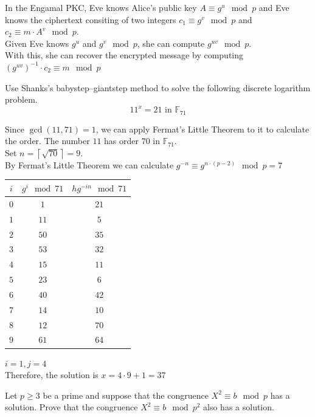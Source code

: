 \documentclass[12pt]{article}
\begin{document}
\solution
In the Engamal PKC, Eve knows Alice's public key $A\equiv g^u\mod{p}$ and Eve knows the ciphertext consiting of two integers $c_1\equiv g^v\mod{p}$ and $c_2\equiv m\cdot A^v\mod{p}$.\\
Given Eve knows $g^u$ and $g^v\mod{p}$, she can compute $g^{uv}\mod{p}$.\\
With this, she can recover the encrypted message by computing $\left(g^{uv}\right)^{-1}\cdot c_2\equiv m\mod{p}$

\problem Use Shanks’s babystep–giantstep method to solve the following discrete logarithm problem.
\[11^x=21 \text{ in } \mathbb{F}_{71}\]

\solution
Since $\gcd(11,71)=1$, we can apply Fermat's Little Theorem to it to calculate the order.
The number $11$ has order $70$ in $\mathbb{F}_{71}$.\\
Set $n=\left\lceil\sqrt{70}\right\rceil=9$.\\
By Fermat's Little Theorem we can calculate $g^{-n}\equiv g^{n\cdot(p-2)}\mod{p}=7$

\noindent
\begin{tabular}{|c|c|c|}
    \hline
    $i$ & $g^i\mod{71}$ & $hg^{-in}\mod{71}$ \\
    \hline
    $0$ & $1$           & $21$               \\
    $1$ & $11$          & $5$                \\
    $2$ & $50$          & $35$               \\
    $3$ & $53$          & $32$               \\
    $4$ & $15$          & $11$               \\
    $5$ & $23$          & $6$                \\
    $6$ & $40$          & $42$               \\
    $7$ & $14$          & $10$               \\
    $8$ & $12$          & $70$               \\
    $9$ & $61$          & $64$               \\
    \hline
\end{tabular}

\noindent
$i=1,j=4$\\
Therefore, the solution is $x=4\cdot9 + 1= 37$

\newpage
\problem Let $p\geq3$ be a prime and suppose that the congruence $X^2\equiv b\mod{p}$ has a solution.
Prove that the congruence $X^2\equiv b\mod{p^2}$ also has a solution.
\end{document}
